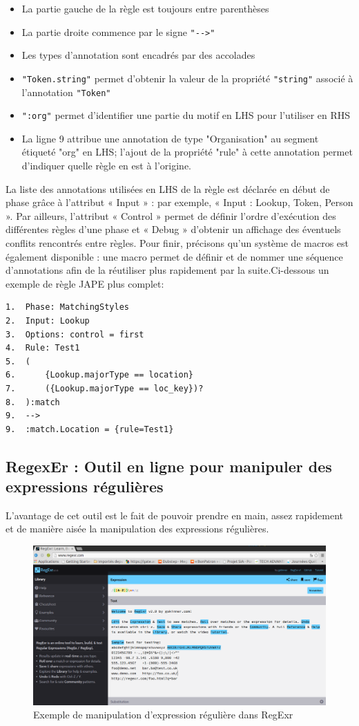 \documentclass[a4paper, 11pt]{report}
\begin{document}
\begin{itemize}
	\item La partie gauche de la règle est toujours entre parenthèses
	\item La partie droite commence par le signe \verb|"-->"|
	\item Les types d'annotation sont encadrés par des accolades
	\item \verb|"Token.string"| permet d'obtenir la valeur de la propriété \verb|"string"| associé à l'annotation \verb|"Token"|
	\item \verb|":org"| permet d'identifier une partie du motif en LHS pour l'utiliser en RHS
	\item La ligne 9 attribue une annotation de type "Organisation" au segment étiqueté "org" en LHS; l'ajout de la propriété "rule" à cette annotation permet d'indiquer quelle règle en est à l'origine.
\end{itemize}
La liste des annotations utilisées en LHS de la règle est déclarée en début de phase grâce à
l'attribut « Input » : par exemple, « Input : Lookup, Token, Person ». Par ailleurs, l'attribut
« Control » permet de définir l'ordre d'exécution des différentes règles d'une phase et « Debug »
d'obtenir un affichage des éventuels conflits rencontrés entre règles.
Pour finir, précisons qu'un système de macros est également disponible : une macro permet
de définir et de nommer une séquence d'annotations afin de la réutiliser plus rapidement par la suite.Ci-dessous un exemple de règle JAPE plus complet:
\begin{verbatim}
1.	Phase: MatchingStyles
2.	Input: Lookup
3.	Options: control = first
4.	Rule: Test1
5.	(
6.		{Lookup.majorType == location}
7.		({Lookup.majorType == loc_key})?
8.	):match
9.	-->
9.	:match.Location = {rule=Test1}
\end{verbatim}
\newpage
\subsection{RegexEr : Outil en ligne pour manipuler des expressions régulières}
L'avantage de cet outil est le fait de pouvoir prendre en main, assez rapidement et de manière aisée la manipulation des expressions régulières.
\begin{figure}[h]
\begin{center}
\includegraphics[scale=0.3]{img/regexr.png} 
\end{center}
\caption{Exemple de manipulation d'expression régulière dans RegExr}
\end{figure}
		
\end{document}
